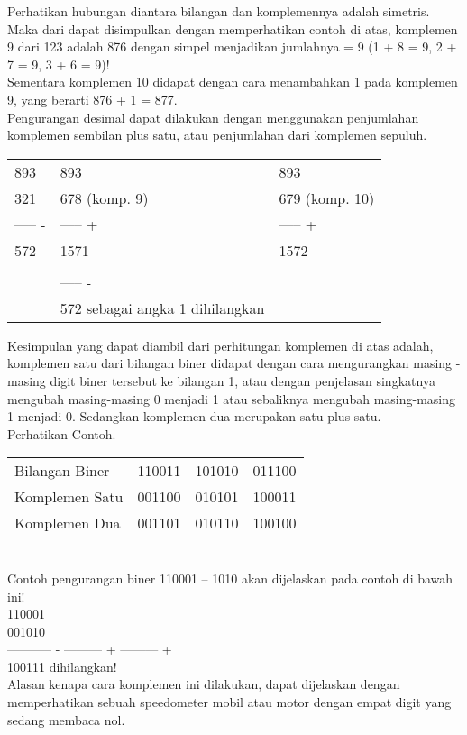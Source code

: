 \begin{enumerate}[label=(\alph*)]
\begin{enumerate}
\qquad Perhatikan hubungan diantara bilangan dan komplemennya adalah simetris. Maka dari dapat disimpulkan dengan memperhatikan contoh di atas, komplemen 9 dari 123 adalah 876 dengan simpel menjadikan jumlahnya = 9 (1 + 8 = 9, 2 + 7 = 9, 3 + 6 = 9)! \\


\qquad Sementara komplemen 10 didapat dengan cara menambahkan 1 pada komplemen 9, yang berarti 876 + 1 = 877. \\

\qquad Pengurangan desimal dapat dilakukan dengan menggunakan penjumlahan komplemen sembilan plus satu, atau penjumlahan dari komplemen sepuluh. \\


\begin{tabular}{ l l l }
893 &  893 & 893 \\ 
321 &  678 (komp. 9) & 679 (komp. 10) \\
----- - & ----- + & ----- + \\
572 & 1571 & 1572 \\
&  \quad1 & \\
& ----- - & \\
& 572 sebagai angka 1 dihilangkan& \\
\end{tabular}

\end{enumerate}
\qquad Kesimpulan yang dapat diambil dari perhitungan komplemen di atas adalah, komplemen satu dari bilangan biner didapat dengan cara mengurangkan masing - masing digit biner tersebut ke bilangan 1, atau dengan penjelasan singkatnya mengubah masing-masing 0 menjadi 1 atau sebaliknya mengubah masing-masing 1 menjadi 0. Sedangkan komplemen dua merupakan satu plus satu. \\
Perhatikan Contoh. \\

\begin{tabular}{ l l l l }
Bilangan Biner &110011& 101010& 011100 \\
Komplemen Satu& 001100 &010101 &100011 \\
Komplemen Dua& 001101& 010110& 100100 \\
\end{tabular}\\

\quad Contoh pengurangan biner 110001 – 1010 akan dijelaskan pada contoh di bawah ini! \\
110001   \\
001010   \\
----------- - --------- + --------- + \\
100111   dihilangkan! \\

\qquad Alasan kenapa cara komplemen ini dilakukan, dapat dijelaskan dengan memperhatikan sebuah speedometer mobil atau motor dengan empat digit yang sedang membaca nol. \\

\end{enumerate}

%
